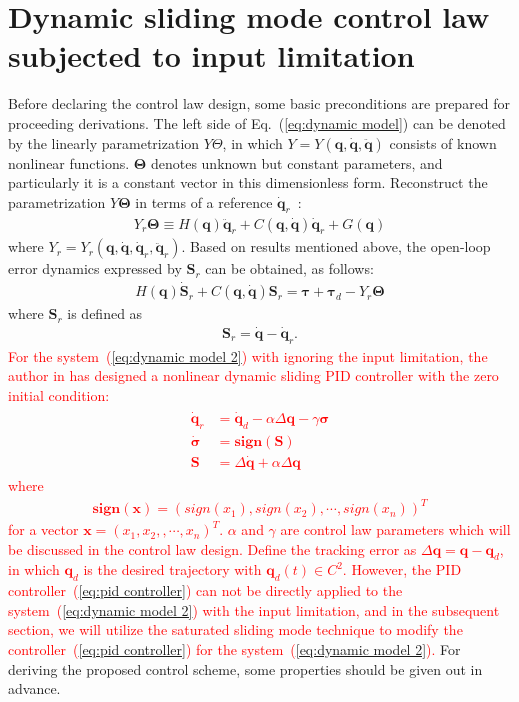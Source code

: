 \documentclass[3p]{elsarticle}
\theoremstyle{plain}
\theoremstyle{remark}
\begin{document}
\section{Dynamic sliding mode control law subjected to input limitation}\label{sec:3}
Before declaring the control law design, some basic preconditions are prepared for proceeding derivations.  The left side of Eq.~(\ref{eq:dynamic model}) can be denoted by the linearly parametrization $Y\Theta$, in which $Y=Y(\bm q,\dot {\bm q},\ddot {\bm q})$ consists of known nonlinear functions. $\bm\Theta$ denotes unknown but constant parameters, and particularly it is a constant vector in this dimensionless form. Reconstruct the parametrization $Y\bm\Theta$ in terms of a reference $\dot{\bm q}_r$~\cite{parra2003dynamic}:
\begin{align}
 Y_r\bm\Theta\equiv H(\bm q)\ddot {\bm q}_r+C(\bm q,\dot {\bm q})\dot {\bm q}_r+G(\bm q)\label{eq:dynamic model 1}
\end{align}
where $Y_r = Y_r(\bm q,\dot{\bm q},\dot{\bm q}_r,\ddot{\bm q}_r)$. Based on results mentioned above, the open-loop error dynamics expressed by $\bm S_r$ can be obtained, as follows:
\begin{align}
H(\bm q)\dot {\bm S}_r+C(\bm q,\dot{\bm q})\bm S_r=\bm\tau +\bm\tau_d- Y_r\bm\Theta\label{eq:dynamic model 2}
\end{align}
where $\bm S_r$ is defined as
\begin{align}
\bm S_r=\dot {\bm q}-\dot {\bm q}_r.\label{eq:Sr1}
\end{align}
\textcolor{red}{For the system~(\ref{eq:dynamic model 2}) with ignoring the input limitation, the author in \cite{parra2003dynamic} has designed a nonlinear dynamic sliding PID controller with the zero initial condition:
\begin{align}\begin{split}
\dot {\bm q}_r&=\dot{\bm q}_d-\alpha\Delta\bm q-\gamma\bm\sigma\\
\dot{\bm\sigma}&=\bm{sign}(\bm S)\\
\bm S&=\Delta\dot{\bm q}+\alpha\Delta\bm q\label{eq:pid controller}
\end{split}\end{align}
where
\begin{align}
\bm{sign}(\bm x) = \left(sign(x_1),sign(x_2),\cdots,sign(x_n)\right)^T
\end{align}
for a vector $\bm x=\left(x_1,x_2,,\cdots,x_n\right)^T$. $\alpha$ and $\gamma$ are control law parameters which will be discussed in the control law design. Define the tracking error as $\Delta \bm q=\bm q-\bm q_d$, in which $\bm q_d$ is the desired trajectory with $\bm q_d(t)\in C^2$. However, the PID controller~(\ref{eq:pid controller}) can not be directly applied to the system~(\ref{eq:dynamic model 2}) with the input limitation, and in the subsequent section, we will utilize the saturated sliding mode technique to modify the controller~(\ref{eq:pid controller}) for the system~(\ref{eq:dynamic model 2}).} For deriving the proposed control scheme, some properties should be given out in advance.
\end{document}
